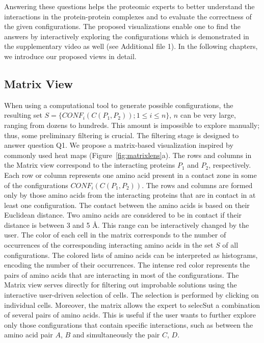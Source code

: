 \documentclass[twocolumn]{bmcart}%
\def\MatView {Matrix view\xspace}
\begin{document}
Answering these questions helps the proteomic experts to better understand the interactions in the protein-protein complexes and to evaluate the correctness of the given configurations.
The proposed visualizations enable one to find the answers by interactively exploring the configurations which is demonstrated in the supplementary video as well (see Additional file 1).
In the following chapters, we introduce our proposed views in detail.


\subsection*{Matrix View}
\label{sec:matview}
When using a computational tool to generate possible configurations, the resulting set $S = \{CONF_i(C(P_1,P_2)); 1 \leq i \leq n\}$, $n$ can be very large, ranging from dozens to hundreds. 
This amount is impossible to explore manually; thus, some preliminary filtering is crucial.
The filtering stage is designed to answer question Q1.
We propose a matrix-based visualization inspired by commonly used heat maps (Figure~\ref{fig:matrixlens}a).
The rows and columns in the \MatView correspond to the interacting proteins $P_1$ and $P_2$, respectively.
Each row or column represents one amino acid present in a contact zone in some of the configurations $CONF_i(C(P_1,P_2))$. 
The rows and columns are formed only by those amino acids from the interacting proteins that are in contact in at least one configuration.
The contact between the amino acids is based on their Euclidean distance. 
Two amino acids are considered to be in contact if their distance is between 3 and 5 \AA.
This range can be interactively changed by the user.
The color of each cell in the matrix corresponds to the number of occurrences of the corresponding interacting amino acids in the set $S$ of all configurations. 
The colored lists of amino acids can be interpreted as histograms, encoding the number of their occurrences.
The intense red color represents the pairs of amino acids that are interacting in most of the configurations.
The \MatView serves directly for filtering out improbable solutions using the interactive user-driven selection of cells.
The selection is performed by clicking on individual cells. 
Moreover, the matrix allows the expert to selecSut a combination of several pairs of amino acids.
This is useful if the user wants to further explore only those configurations that contain specific interactions, such as between the amino acid pair $A$, $B$ and simultaneously the pair $C$, $D$.  
\end{document}
